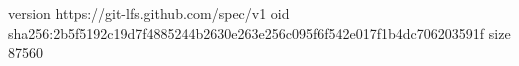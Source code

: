 version https://git-lfs.github.com/spec/v1
oid sha256:2b5f5192c19d7f4885244b2630e263e256c095f6f542e017f1b4dc706203591f
size 87560
